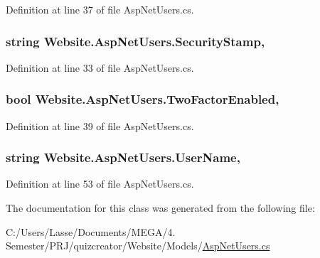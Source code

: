 Definition at line 37 of file Asp\+Net\+Users.\+cs.

\hypertarget{class_website_1_1_asp_net_users_ad6ea9fb08bc75496821b61f7da9f5af6}{}
\subsubsection[{Security\+Stamp}]{\setlength{\rightskip}{0pt plus 5cm}string Website.\+Asp\+Net\+Users.\+Security\+Stamp\hspace{0.3cm}{\ttfamily [get]}, {\ttfamily [set]}}\label{class_website_1_1_asp_net_users_ad6ea9fb08bc75496821b61f7da9f5af6}


Definition at line 33 of file Asp\+Net\+Users.\+cs.

\hypertarget{class_website_1_1_asp_net_users_af672e585c81b55f9a37ed3b4816252d2}{}
\subsubsection[{Two\+Factor\+Enabled}]{\setlength{\rightskip}{0pt plus 5cm}bool Website.\+Asp\+Net\+Users.\+Two\+Factor\+Enabled\hspace{0.3cm}{\ttfamily [get]}, {\ttfamily [set]}}\label{class_website_1_1_asp_net_users_af672e585c81b55f9a37ed3b4816252d2}


Definition at line 39 of file Asp\+Net\+Users.\+cs.

\hypertarget{class_website_1_1_asp_net_users_ada29c49ac9d4f6a95291c007d9165701}{}
\subsubsection[{User\+Name}]{\setlength{\rightskip}{0pt plus 5cm}string Website.\+Asp\+Net\+Users.\+User\+Name\hspace{0.3cm}{\ttfamily [get]}, {\ttfamily [set]}}\label{class_website_1_1_asp_net_users_ada29c49ac9d4f6a95291c007d9165701}


Definition at line 53 of file Asp\+Net\+Users.\+cs.



The documentation for this class was generated from the following file\+:\begin{DoxyCompactItemize}
\item 
C\+:/\+Users/\+Lasse/\+Documents/\+M\+E\+G\+A/4. Semester/\+P\+R\+J/quizcreator/\+Website/\+Models/\hyperlink{_asp_net_users_8cs}{Asp\+Net\+Users.\+cs}\end{DoxyCompactItemize}
